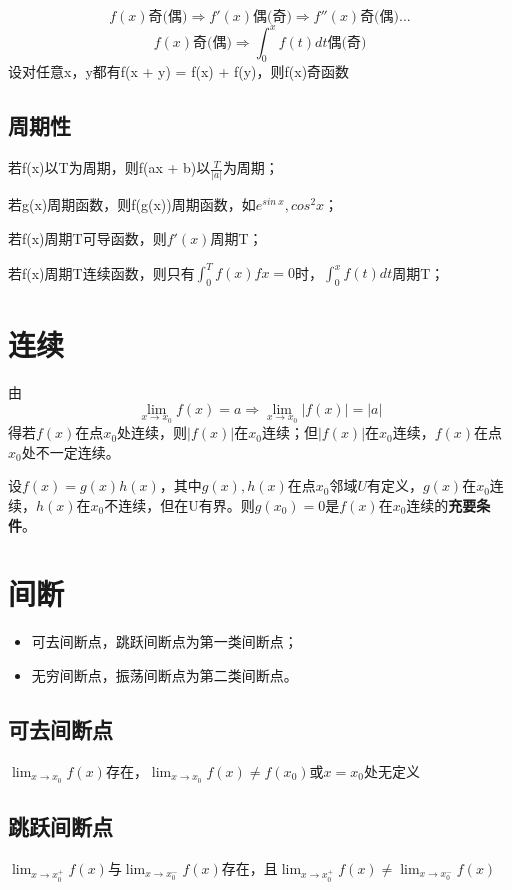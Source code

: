 \[f(x)\text{奇(偶)} \Rightarrow f'(x)\text{偶(奇)} \Rightarrow f''(x)\text{奇(偶)} ...\]
\[f(x)\text{奇(偶)} \Rightarrow \int_0^x f(t)dt\text{偶(奇)}\]
设对任意x，y都有f(x + y) = f(x) + f(y)，则f(x)奇函数


\subsection{周期性}
若f(x)以T为周期，则f(ax + b)以\(\frac{T}{|a|}\)为周期；

若g(x)周期函数，则f(g(x))周期函数，如\(e^{sin\ x}, cos^2x\)；

若f(x)周期T可导函数，则\(f'(x)\)周期T；

若f(x)周期T连续函数，则只有\(\displaystyle \int_0^Tf(x)fx = 0\)时，\(\displaystyle \int_0^xf(t)dt\)周期T；


\section{连续}

由\[\lim_{x \to x_0}f(x) = a \Rightarrow \lim_{x \to x_0}|f(x)| = |a|\]
得若\(f(x)\)在点\(x_0\)处连续，则\(|f(x)|\)在\(x_0\)连续；但\(|f(x)|\)在\(x_0\)连续，\(f(x)\)在点\(x_0\)处不一定连续。

设\(f(x) = g(x)h(x)\)，其中\(g(x), h(x)\)在点\(x_0\)邻域\(U\)有定义，\(g(x)\)在\(x_0\)连续，\(h(x)\)在\(x_0\)不连续，但在U有界。则\(g(x_0) = 0\)是\(f(x)\)在\(x_0\)连续的\textbf{充要条件}。


\section{间断}
\begin{itemize}
    \item 可去间断点，跳跃间断点为第一类间断点；
    \item 无穷间断点，振荡间断点为第二类间断点。
\end{itemize}

\subsection{可去间断点}
\(\displaystyle \lim_{x \to x_0}f(x)\)存在，\(\displaystyle \lim_{x \to x_0}f(x) \neq f(x_0)\)或\(x = x_0\)处无定义

\subsection{跳跃间断点}
\(\displaystyle \lim_{x \to x_0^+}f(x)\)与\(\displaystyle \lim_{x \to x_0^-}f(x)\)存在，且\(\displaystyle \lim_{x \to x_0^+}f(x) \neq \displaystyle \lim_{x \to x_0^-}f(x)\)

